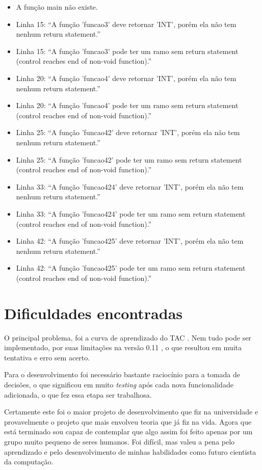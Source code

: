 \documentclass[12pt]{article}
\begin{document}
\begin{itemize}
	\item A função main não existe.
	\item Linha 15: ``A função 'funcao3' deve retornar 'INT', porém ela não tem nenhum return statement.''
	\item Linha 15: ``A função 'funcao3' pode ter um ramo sem return statement (control reaches end of non-void function).''
	\item Linha 20: ``A função 'funcao4' deve retornar 'INT', porém ela não tem nenhum return statement.''
	\item Linha 20: ``A função 'funcao4' pode ter um ramo sem return statement (control reaches end of non-void function).''
	\item Linha 25: ``A função 'funcao42' deve retornar 'INT', porém ela não tem nenhum return statement.''
	\item Linha 25: ``A função 'funcao42' pode ter um ramo sem return statement (control reaches end of non-void function).''
	\item Linha 33: ``A função 'funcao424' deve retornar 'INT', porém ela não tem nenhum return statement.''
	\item Linha 33: ``A função 'funcao424' pode ter um ramo sem return statement (control reaches end of non-void function).''
	\item Linha 42: ``A função 'funcao425' deve retornar 'INT', porém ela não tem nenhum return statement.''
	\item Linha 42: ``A função 'funcao425' pode ter um ramo sem return statement (control reaches end of non-void function).''\\

\end{itemize}

\section{Dificuldades encontradas}

\indent

O principal problema, foi a curva de aprendizado do TAC \cite{tac2014}. Nem tudo pode ser implementado, por suas limitações na versão 0.11 \cite{tac2014}, o que resultou em muita tentativa e erro sem acerto.

Para o desenvolvimento foi necessário bastante raciocínio para a tomada de decisões, o que significou em muito \textit{testing} após cada nova funcionalidade adicionada, o que fez essa etapa ser trabalhosa.

Certamente este foi o maior projeto de desenvolvimento que fiz na universidade e provavelmente o projeto que mais envolveu teoria que já fiz na vida. Agora que está terminado sou capaz de contemplar que algo assim foi feito apenas por um grupo muito pequeno de seres humanos. Foi difícil, mas valeu a pena pelo aprendizado e pelo desenvolvimento de minhas habilidades como futuro cientista da computação.



\end{document}

